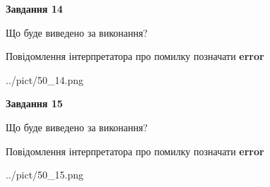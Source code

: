 \documentclass[11pt, ukrainian]{article}
\begin{document}
{\begin {large}
{\begin {center}\textbf{Завдання 14}\end {center}}\par
Що буде виведено за виконання? \par
Повідомлення інтерпретатора про помилку позначати \textbf{error}

\begin{center}
	{../pict/50_14.png}
\end{center}
\newpage

{\begin {center}\textbf{Завдання 15}\end {center}}\par
Що буде виведено за виконання? \par
Повідомлення інтерпретатора про помилку позначати \textbf{error}

\begin{center}
	{../pict/50_15.png}
\end{center}
\newpage

\end {large}}
\end{document}
